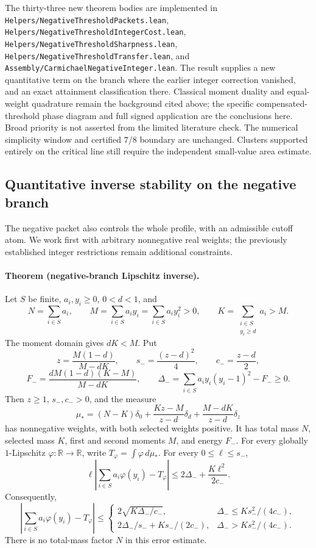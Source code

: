 The thirty-three new theorem bodies are implemented in
\texttt{Helpers/NegativeThresholdPackets.lean},
\texttt{Helpers/NegativeThresholdIntegerCost.lean},
\texttt{Helpers/NegativeThresholdSharpness.lean},
\texttt{Helpers/NegativeThresholdTransfer.lean}, and
\texttt{Assembly/CarmichaelNegativeInteger.lean}.
The result supplies a new quantitative term on the branch where the earlier
integer correction vanished, and an exact attainment classification there.
Classical moment duality and equal-weight quadrature remain the background
cited above; the specific compensated-threshold phase diagram and full
signed application are the conclusions here.  Broad priority is not asserted
from the limited literature check.  The numerical simplicity window and
certified \(7/8\) boundary are unchanged.  Clusters supported entirely on
the critical line still require the independent small-value area estimate.

\subsection{Quantitative inverse stability on the negative branch}
\label{subsec:negative-threshold-transport}

The negative packet also controls the whole profile, with an admissible
cutoff atom.  We work first with arbitrary nonnegative real weights;
the previously established integer restrictions remain additional constraints.

\paragraph{Theorem (negative-branch Lipschitz inverse).}
Let \(S\) be finite, \(a_i,y_i\ge0\), \(0<d<1\), and
\[
 N=\sum_{i\in S}a_i,\qquad
 M=\sum_{i\in S}a_i y_i=\sum_{i\in S}a_i y_i^2>0,\qquad
 K=\sum_{\substack{i\in S\\y_i\ge d}}a_i>M.
\]
The moment domain gives \(dK<M\).  Put
\[
 z=\frac{M(1-d)}{M-dK},\qquad
 s_-=\frac{(z-d)^2}{4},\qquad c_-=\frac{z-d}{2},
\]
\[
 F_-=\frac{dM(1-d)(K-M)}{M-dK},\qquad
 \Delta_-=\sum_{i\in S}a_i y_i(y_i-1)^2-F_-\ge0.
\]
Then \(z\ge1\), \(s_-,c_->0\), and the measure
\[
 \mu_*=(N-K)\delta_0+
       \frac{Kz-M}{z-d}\delta_d+
       \frac{M-dK}{z-d}\delta_z
\]
has nonnegative weights, with both selected weights positive.
It has total mass \(N\), selected mass \(K\), first and second
moments \(M\), and energy \(F_-\).
For every globally \(1\)-Lipschitz
\(\varphi:\mathbb R\to\mathbb R\), write
\(T_\varphi=\int\varphi\,d\mu_*\).  For every \(0\le\ell\le s_-\),
\[
 \ell\left|\sum_{i\in S}a_i\varphi(y_i)-T_\varphi\right|
 \le 2\Delta_-+\frac{K\ell^2}{2c_-}.
\]
Consequently,
\[
 \left|\sum_{i\in S}a_i\varphi(y_i)-T_\varphi\right|
 \le
 \begin{cases}
  2\sqrt{K\Delta_-/c_-},
      &\Delta_-\le Ks_-^2/(4c_-),\\[2pt]
  2\Delta_-/s_-+Ks_-/(2c_-),
      &\Delta_->Ks_-^2/(4c_-).
 \end{cases}
\]
There is no total-mass factor \(N\) in this error estimate.

